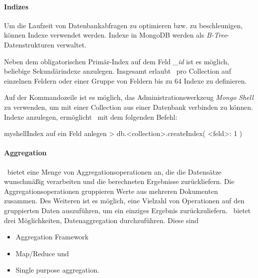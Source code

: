 \paragraph{Indizes}
Um die Laufzeit von Datenbankabfragen zu optimieren bzw. zu beschleunigen, können Indexe verwendet werden. Indexe in MongoDB werden als \textit{B-Tree}-Datenstrukturen \cite{b-tree} verwaltet.

Neben dem obligatorischen Primär-Index auf dem Feld \textit{\_id} ist es möglich, beliebige Sekundärindexe anzulegen. Insgesamt erlaubt \mongo\, pro Collection auf einzelnen Feldern oder einer Gruppe von Feldern bis zu 64 Indexe zu definieren.

Auf der Kommandozeile ist es möglich, das Administrationswerkzeug \textit{Mongo Shell} zu verwenden, um mit einer Collection aus einer Datenbank verbinden zu können. Indexe anzulegen, ermöglicht \mongo\ mit dem folgenden Befehl: 
\begin{listingsboxShell}[label={lst:createIndex}]{myshell}{Index auf ein Feld anlegen}
> db.<collection>.createIndex( {<feld>: 1} )
\end{listingsboxShell}

\paragraph{Aggregation}\label{aggr}
\mongo\ bietet eine Menge von Aggregationsoperationen an, die die Datensätze wunschmäßig verarbeiten und die berechneten Ergebnisse zurückliefern. Die Aggregationsoperationen gruppieren Werte aus mehreren Dokumenten zusammen. Des Weiteren ist es möglich, eine Vielzahl von Operationen auf den gruppierten Daten auszuführen, um ein einziges Ergebnis zurückzuliefern. \mongo\ bietet drei Möglichkeiten, Datenaggregation durchzuführen. Diese sind 
\begin{itemize}
\item Aggregation Framework
\item Map/Reduce und
\item Single purpose aggregation.\cite{aggr}
\end{itemize}

